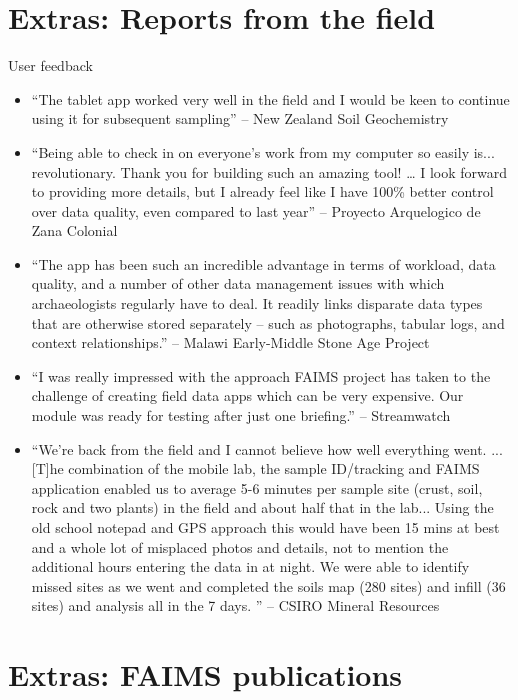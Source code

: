 \documentclass[aspectratio=169, 12pt]{beamer} %
\begin{document}
\section{Extras: Reports from the field}

\begin{frame}[allowframebreaks]{User feedback}
    \begin{itemize}[label=\textbullet]
        \item ``The tablet app worked very well in the field and I would be keen to continue using it for subsequent sampling'' -- New Zealand Soil Geochemistry
        \item ``Being able to check in on everyone's work from my computer so easily is... revolutionary. Thank you for building such an amazing tool! …  I look forward to providing more details, but I already feel like I have 100\%{} better control over data quality, even compared to last year'' -- Proyecto Arquelogico de Zana Colonial
        \item ``The app has been such an incredible advantage in terms of workload, data quality, and a number of other data management issues with which archaeologists regularly have to deal. It readily links disparate data types that are otherwise stored separately – such as photographs, tabular logs, and context relationships.'' -- Malawi Early-Middle Stone Age Project
        \item ``I was really impressed with the approach FAIMS project has taken to the challenge of creating field data apps which can be very expensive. Our module was ready for testing after just one briefing.'' -- Streamwatch
        \item ``We’re back from the field and I cannot believe how well everything went. ... [T]he combination of the mobile lab, the sample ID/tracking and FAIMS application enabled us to average 5-6 minutes per sample site (crust, soil, rock and two plants)  in the field and about half that in the lab... Using the old school notepad and GPS approach this would have been 15 mins at best and a whole lot of misplaced photos and details, not to mention the additional hours entering the data in at night. We were able to identify missed sites as we went and completed the soils map (280 sites) and infill (36 sites) and analysis all in the 7 days. '' -- CSIRO Mineral Resources
    \end{itemize}
\end{frame}

\section{Extras: FAIMS publications}
\end{document}

